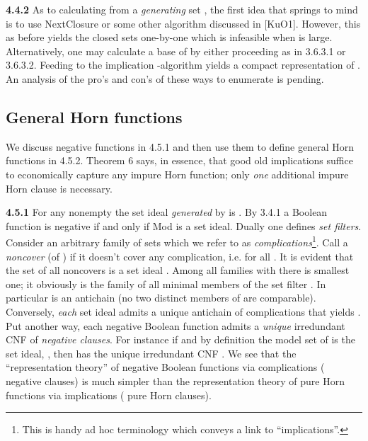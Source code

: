 \documentclass[11pt]{article}
\begin{document}
{\bf 4.4.2} As to calculating  from a {\it generating} set , the first idea that springs to mind is to use NextClosure or some other algorithm discussed in [KuO1].  However, this as before yields the closed sets one-by-one which is infeasible when  is large. Alternatively, one may calculate a base  of  by either proceeding as in 3.6.3.1 or 3.6.3.2. Feeding  to the implication -algorithm yields a compact representation of . An analysis of the pro's and con's of these ways to enumerate  is  pending.



\subsection{General Horn functions}


We discuss negative functions in 4.5.1 and then use them to define general Horn functions in 4.5.2. Theorem 6 says, in essence, that good old implications suffice to economically capture any impure Horn function; only {\it one} additional impure Horn clause is necessary.

{\bf 4.5.1} For any nonempty  the set ideal {\it generated} by  is . By 3.4.1 a Boolean function  is negative if and only if Mod is a set ideal. Dually one defines {\it set filters}. Consider an arbitrary family  of sets  which we refer to as {\it complications}\footnote{This is handy ad hoc terminology which conveys a link to ``implications''.}.
Call  a {\it noncover} (of ) if it doesn't cover any complication, i.e.  for all . It is evident that the set  of all noncovers is a set ideal . 
Among all families  with  there is smallest one; it obviously is the family  of all minimal members of the set filter . In particular  is an antichain (no two distinct members of  are comparable). Conversely, {\it each} set ideal  admits a unique antichain  of complications  that yields . Put another way, each negative Boolean function  admits a {\it unique} irredundant CNF of {\it negative clauses}. For instance if  and by definition the model set of  is the set ideal, , then  has the unique irredundant CNF  . We see that the ``representation theory'' of negative Boolean functions  via complications ( negative clauses) is much simpler than the representation theory of pure Horn functions  via implications ( pure Horn clauses).
\end{document}
